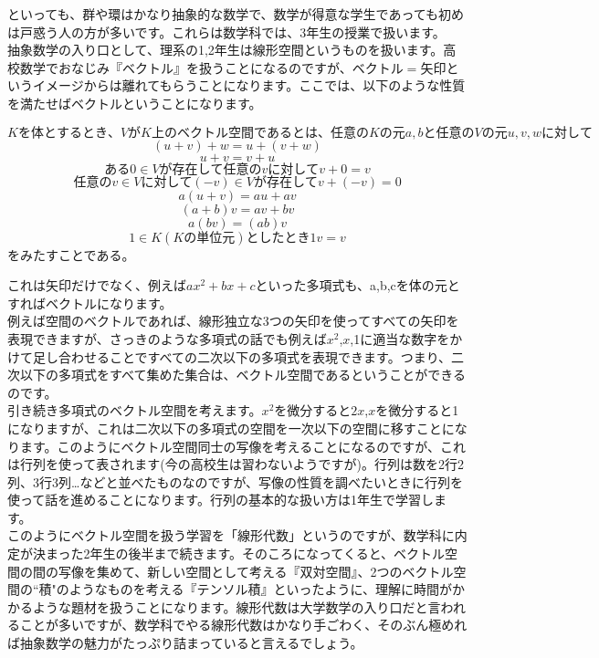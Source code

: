 
といっても、群や環はかなり抽象的な数学で、数学が得意な学生であっても初めは戸惑う人の方が多いです。これらは数学科では、3年生の授業で扱います。\\
抽象数学の入り口として、理系の1,2年生は線形空間というものを扱います。高校数学でおなじみ『ベクトル』を扱うことになるのですが、$ベクトル = 矢印$というイメージからは離れてもらうことになります。ここでは、以下のような性質を満たせばベクトルということになります。

\[
Kを体とするとき、VがK上のベクトル空間であるとは、任意のKの元a,bと任意のVの元u,v,wに対して
\]
\[
(u + v) + w = u + (v + w)
\]
\[
u + v = v + u
\]
\[
ある0 \in V が存在して任意のvに対して v + 0 = v
\]
\[
任意のv \in V に対して (-v) \in Vが存在して v + (-v) = 0
\]
\[
a(u + v) = au + av
\]
\[
(a + b)v = av + bv
\]
\[
a(bv) = (ab)v
\]
\[
1 \in K(Kの単位元)としたとき 1v = v
\]
をみたすことである。



これは矢印だけでなく、例えば$ax^2 + bx + c$といった多項式も、a,b,cを体の元とすればベクトルになります。\\
例えば空間のベクトルであれば、線形独立な3つの矢印を使ってすべての矢印を表現できますが、さっきのような多項式の話でも例えば$x ^ 2$,$x$,1に適当な数字をかけて足し合わせることですべての二次以下の多項式を表現できます。つまり、二次以下の多項式をすべて集めた集合は、ベクトル空間であるということができるのです。\\
引き続き多項式のベクトル空間を考えます。$x^2$を微分すると$2x$,$x$を微分すると1になりますが、これは二次以下の多項式の空間を一次以下の空間に移すことになります。このようにベクトル空間同士の写像を考えることになるのですが、これは行列を使って表されます(今の高校生は習わないようですが)。行列は数を2行2列、3行3列…などと並べたものなのですが、写像の性質を調べたいときに行列を使って話を進めることになります。行列の基本的な扱い方は1年生で学習します。\\
このようにベクトル空間を扱う学習を「線形代数」というのですが、数学科に内定が決まった2年生の後半まで続きます。そのころになってくると、ベクトル空間の間の写像を集めて、新しい空間として考える『双対空間』、2つのベクトル空間の``積"のようなものを考える『テンソル積』といったように、理解に時間がかかるような題材を扱うことになります。線形代数は大学数学の入り口だと言われることが多いですが、数学科でやる線形代数はかなり手ごわく、そのぶん極めれば抽象数学の魅力がたっぷり詰まっていると言えるでしょう。